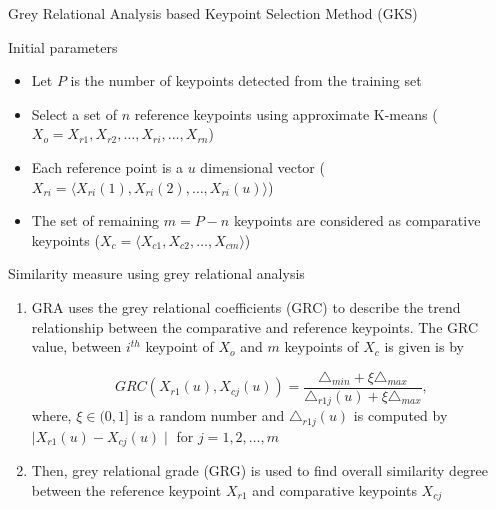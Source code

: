 \documentclass [9pt,times] {beamer}
\begin{document}
\begin{frame}[fragile]{Grey Relational Analysis based Keypoint Selection Method (GKS)}\label{KGRA}
\scriptsize
\begin{block}{Initial parameters}

\begin{itemize}
\justifying
	\item Let $P$ is the number of keypoints detected from the training set
	
	\item Select a set of $n$ reference keypoints using approximate K-means ($X_o={X_{r1}, X_{r2}, \dots, X_{ri}, \dots, X_{rn}}$)
	
	\item Each reference point is a $u$ dimensional vector  ($	X_{ri}=\langle X_{ri}(1), X_{ri}(2), \dots, X_{ri}(u) \rangle$)
	\item The set of remaining $m=P-n$ keypoints are considered as comparative keypoints ($	X_{c}=\langle X_{c1}, X_{c2}, \dots, X_{cm} \rangle$)	
	\end{itemize}
\end{block}


\begin{block}{Similarity measure using grey relational analysis}
\begin{enumerate}
\item GRA uses the  grey relational coefficients (GRC) to describe the trend relationship between the comparative and reference keypoints. The GRC value, between $i^{th}$ keypoint of $X_o$ and $m$ keypoints of $X_c$ is given is by

\begin{equation*} \label{eq:grc}
GRC(X_{r1}(u), X_{cj}(u))=\frac{ \triangle_{min} + \xi \triangle_{max} }{\triangle_{r1j}(u)+\xi \triangle_{max}}, 
\end{equation*}
where,  $\xi \in (0,1]$ is a random number and  $ \triangle_{r1j}(u)$ is computed by $\mid X_{r1}(u) - X_{cj}(u) \mid$ for  $j=1, 2, \dots, m$

\item Then, grey relational grade (GRG) is used to find overall similarity degree between the reference keypoint $X_{r1}$ and comparative keypoints $X_{cj}$


\end{enumerate}
\end{block}
\end{frame}
\end{document}
